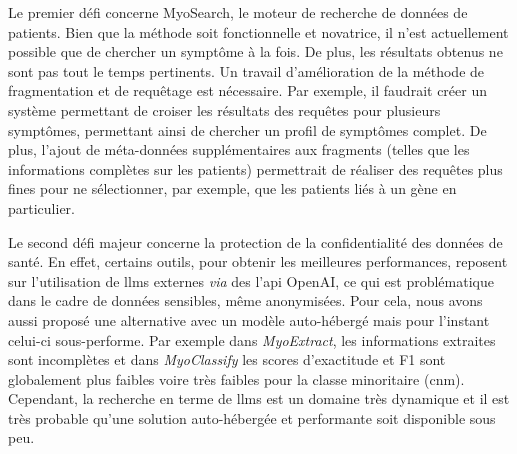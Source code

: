 Le premier défi concerne MyoSearch, le moteur de recherche de données de patients. Bien que la méthode soit fonctionnelle et novatrice, il n'est actuellement possible que de chercher un symptôme à la fois. De plus, les résultats obtenus ne sont pas tout le temps pertinents. Un travail d'amélioration de la méthode de fragmentation et de requêtage est nécessaire. Par exemple, il faudrait créer un système permettant de croiser les résultats des requêtes pour plusieurs symptômes, permettant ainsi de chercher un profil de symptômes complet. De plus, l'ajout de méta-données supplémentaires aux fragments (telles que les informations complètes sur les patients) permettrait de réaliser des requêtes plus fines pour ne sélectionner, par exemple, que les patients liés à un gène en particulier.

Le second défi majeur concerne la protection de la confidentialité des données de santé. En effet, certains outils, pour obtenir les meilleures performances, reposent sur l'utilisation de \gls{llms} externes \textit{via} des l'\gls{api} OpenAI, ce qui est problématique dans le cadre de données sensibles, même anonymisées. Pour cela, nous avons aussi proposé une alternative avec un modèle auto-hébergé mais pour l'instant celui-ci sous-performe. Par exemple dans \textit{MyoExtract}, les informations extraites sont incomplètes et dans \textit{MyoClassify} les scores d'exactitude et F1 sont globalement plus faibles voire très faibles pour la classe minoritaire (\gls{cnm}). Cependant, la recherche en terme de \gls{llms} est un domaine très dynamique et il est très probable qu'une solution auto-hébergée et performante soit disponible sous peu.